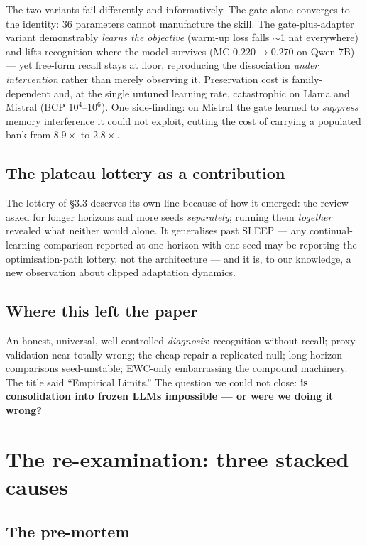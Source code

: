 \documentclass[11pt]{article}
\begin{document}
The two variants fail differently and informatively. The gate alone converges to the identity: 36 parameters cannot
manufacture the skill. The gate-plus-adapter variant demonstrably \emph{learns the objective}
(warm-up loss falls $\sim$1 nat everywhere) and lifts recognition where the model survives (MC
$0.220 \to 0.270$ on Qwen-7B) --- yet free-form recall stays at floor, reproducing the
dissociation \emph{under intervention} rather than merely observing it. Preservation cost is
family-dependent and, at the single untuned learning rate, catastrophic on Llama and Mistral (BCP
$10^{4}$--$10^{6}$). One side-finding: on Mistral the gate learned to \emph{suppress} memory
interference it could not exploit, cutting the cost of carrying a populated bank from $8.9\times$
to $2.8\times$.

\subsection{The plateau lottery as a contribution}

The lottery of \S3.3 deserves its own line because of how it emerged: the review asked for longer
horizons and more seeds \emph{separately}; running them \emph{together} revealed what neither
would alone. It generalises past SLEEP --- any continual-learning comparison reported at one
horizon with one seed may be reporting the optimisation-path lottery, not the architecture --- and
it is, to our knowledge, a new observation about clipped adaptation dynamics.

\subsection{Where this left the paper}

An honest, universal, well-controlled \emph{diagnosis}: recognition without recall; proxy
validation near-totally wrong; the cheap repair a replicated null; long-horizon comparisons
seed-unstable; EWC-only embarrassing the compound machinery. The title said ``Empirical Limits.''
The question we could not close: \textbf{is consolidation into frozen LLMs impossible --- or were
we doing it wrong?}

\section{The re-examination: three stacked causes}

\subsection{The pre-mortem}
\end{document}
